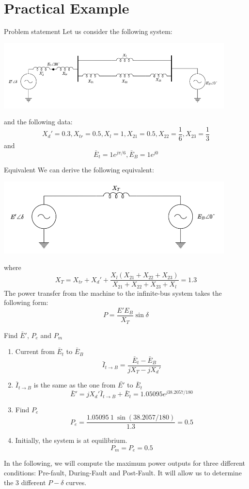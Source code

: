 \section{Practical Example}
\begin{frame}[allowframebreaks]{Problem statement}
Let us consider the following system:
\begin{center}
\includegraphics[width=0.9\textwidth]{images/InitialSystem.png}
\end{center}
and the following data:
$$X_d' = 0.3, X_{tr} = 0.5, X_{l} = 1, X_{21} = 0.5, X_{22} = \frac{1}{6}, X_{23} = \frac{1}{3}$$
and
$$\bar{E}_{t} = 1e^{j \pi/6}, \bar{E}_{B} = 1e^{j0}$$
\end{frame}

\begin{frame}[allowframebreaks]{Equivalent}
We can derive the following equivalent:
\begin{center}
\includegraphics[width=0.9\textwidth]{images/InitialSystemEq.png}
\end{center}
where
$$X_T = X_{tr} + X_{d}' + \frac{X_{l}\left(X_{21}+X_{22}+X_{23}\right)}{X_{21}+X_{22}+X_{23}+X_{l}} = 1.3$$
The power transfer from the machine to the infinite-bus system takes the following form:
$$P = \frac{E' E_{B}}{X_{T}} \sin \delta$$
\end{frame}

\begin{frame}[allowframebreaks]{Find $\bar{E}'$, $P_e$ and $P_m$}
\begin{enumerate}
    \item Current from $\bar{E}_{t}$ to $\bar{E}_{B}$
    $$\bar{I}_{t\rightarrow B} = \frac{\bar{E}_{t}-\bar{E}_{B}}{jX_{T} - jX_{d}'}$$
    \item $\bar{I}_{t\rightarrow B}$ is the same as the one from $\bar{E'}$ to $\bar{E}_{t}$
    $$\bar{E}' = j X_{d}' \bar{I}_{t\rightarrow B} + \bar{E}_{t} = 1.05095 e^{j 38.2057/180}$$
    \item Find $P_e$
    $$P_e = \frac{1.05095\ 1\ \sin(38.2057/180)}{1.3} = 0.5$$
    \item Initially, the system is at equilibrium.
    $$P_m = P_e = 0.5$$
\end{enumerate}
In the following, we will compute the maximum power outputs for three different conditions: Pre-fault, During-Fault and Post-Fault. It will allow us to determine the 3 different $P-\delta$ curves.
\end{frame}

